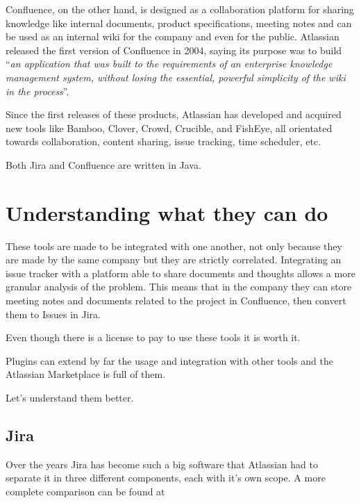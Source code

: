 Confluence, on the other hand, is designed as a collaboration platform for sharing knowledge like internal documents, product specifications, meeting notes and can be used as an internal wiki for the company and even for the public.
Atlassian released the first version of Confluence in 2004, saying its purpose was to build ``\textit{an application that was built to the requirements of an enterprise knowledge management system, without losing the essential, powerful simplicity of the wiki in the process}''.

Since the first releases of these products, Atlassian has developed and acquired new tools like Bamboo, Clover, Crowd, Crucible, and FishEye, all orientated towards collaboration, content sharing, issue tracking, time scheduler, etc.

Both Jira and Confluence are written in Java.

\section{Understanding what they can do}
These tools are made to be integrated with one another, not only because they are made by the same company but they are strictly correlated.
Integrating an issue tracker with a platform able to share documents and thoughts allows a more granular analysis of the problem.
This means that in the company they can store meeting notes and documents related to the project in Confluence, then convert them to Issues in Jira.

Even though there is a license to pay to use these tools it is worth it.

Plugins can extend by far the usage and integration with other tools and the Atlassian Marketplace is full of them.

Let's understand them better.
	
	\subsection{Jira}
	
		Over the years Jira has become such a big software that Atlassian had to separate it in three different components, each with it's own scope.
		A more complete comparison can be found at 
	
